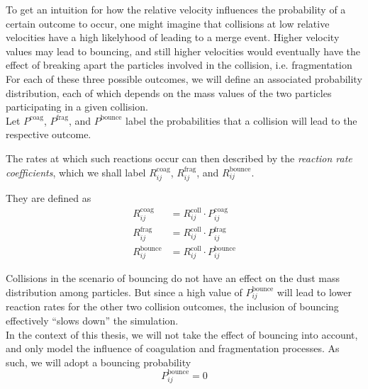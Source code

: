         To get an intuition for how the relative velocity influences the probability of a 
        certain outcome to occur, one might imagine that collisions at low relative velocities have 
        a high likelyhood of leading to a merge event. Higher velocity values may lead to 
        bouncing, and still higher velocities would eventually have the effect 
        of breaking apart the particles involved in the collision, i.e. fragmentation \\

        For each of these three possible outcomes, we will define an associated probability 
        distribution, each of which depends on the mass values of the two particles participating 
        in a given collision. \\

        Let $P^\text{coag}$, $P^\text{frag}$, and $P^\text{bounce}$
        label the probabilities that a collision will lead to the respective outcome. \\

        \clearpage

        The rates at which such reactions occur can then described by the 
        \textit{reaction rate coefficients}, which we shall label 
        $R_{ij}^\text{coag}$, $R_{ij}^\text{frag}$, and $R_{ij}^\text{bounce}$. 

        They are defined as 
        \begin{align}
            R^\text{coag}_{ij}   &= R^\text{coll}_{ij} \cdot P^\text{coag}_{ij} \\
            R^\text{frag}_{ij}   &= R^\text{coll}_{ij} \cdot P^\text{frag}_{ij} \\
            R^\text{bounce}_{ij} &= R^\text{coll}_{ij} \cdot P^\text{bounce}_{ij}
        \end{align}

        Collisions in the scenario of bouncing do not have an effect on the dust mass distribution
        among particles. But since a high value of $P^\text{bounce}_{ij}$ will lead to lower 
        reaction rates for the other two collision outcomes, the inclusion of bouncing effectively 
        ``slows down'' the simulation. \\

        In the context of this thesis, we will not take the effect of bouncing into account, and 
        only model the influence of coagulation and fragmentation processes. As such, we will adopt 
        a bouncing probability 
        \begin{equation}
            P_{ij}^\text{bounce}=0 
        \end{equation}

